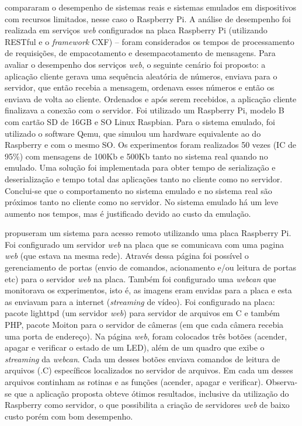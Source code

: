 \citet{nunes:2014:analise} compararam o desempenho de sistemas reais e sistemas emulados em dispositivos com recursos limitados, nesse caso o Raspberry Pi. A análise de desempenho foi realizada em serviços \textit{web} configurados na placa Raspberry Pi (utilizando RESTful e o \textit{framework} CXF) – foram considerados os tempos de processamento de requisições, de empacotamento e desempacotamento de mensagens. Para avaliar o desempenho dos serviços \textit{web}, o seguinte cenário foi proposto: a aplicação cliente gerava uma sequência aleatória de números, enviava para o servidor, que então recebia a mensagem, ordenava esses números e então os enviava de volta ao cliente. Ordenados e após serem recebidos, a aplicação cliente finalizava a conexão com o servidor. Foi utilizado um Raspberry Pi, modelo B com cartão SD de 16GB e SO Linux Raspbian. Para o sistema emulado, foi utilizado o software Qemu, que simulou um hardware equivalente ao do Raspberry e com o mesmo SO. Os experimentos foram realizados 50 vezes (IC de 95\%) com mensagens de 100Kb e 500Kb tanto no sistema real quando no emulado. Uma solução foi implementada para obter tempo de serialização e deserialização e tempo total das aplicações tanto no cliente como no servidor. Conclui-se  que o comportamento no sistema emulado e no sistema real são próximos tanto no cliente como no servidor. No sistema emulado há um leve aumento nos tempos, mas é justificado devido ao custo da emulação.

\citet{crotti:2013:raspberry} propuseram um sistema para acesso remoto utilizando uma placa Raspberry Pi. Foi configurado um servidor \textit{web} na placa que se comunicava com uma pagina \textit{web} (que estava na mesma rede). Através dessa página foi possível o gerenciamento de portas (envio de comandos, acionamento e/ou leitura de portas etc) para o servidor \textit{web} na placa. Também foi configurado uma \textit{webcan} que monitorava os experimentos, isto é, as imagens eram envidas para a placa e esta as enviavam para a internet (\textit{streaming} de vídeo). Foi configurado na placa: pacote lighttpd (um servidor \textit{web}) para servidor de arquivos em C e também PHP, pacote Moiton para o servidor de câmeras (em que cada câmera recebia uma porta de endereço). Na página \textit{web}, foram colocados três botões (acender, apagar e verificar o estado de um LED), além de um quadro que exibe o \textit{streaming} da \textit{webcan}. Cada um desses botões enviava comandos de leitura de arquivos (.C) específicos localizados no servidor de arquivos. Em cada um desses arquivos continham as rotinas e as funções (acender, apagar e verificar).  Observa-se que a aplicação proposta obteve ótimos resultados, inclusive da utilização do Raspberry como servidor, o que possibilita a criação de servidores \textit{web} de baixo custo porém com bom desempenho.

